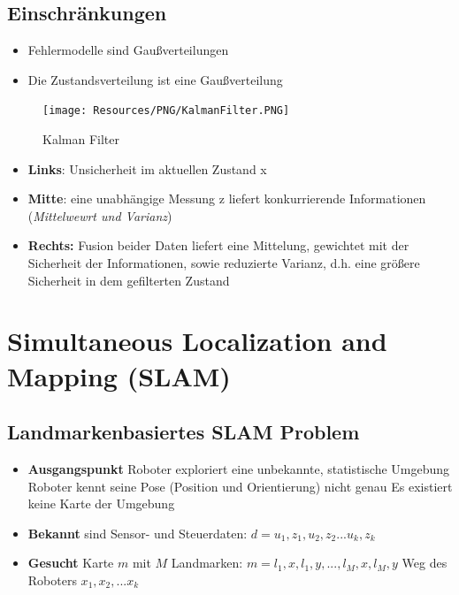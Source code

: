 \subsection{Einschränkungen}
\begin{itemize}
	\item Fehlermodelle sind Gaußverteilungen
	\item Die Zustandsverteilung ist eine Gaußverteilung
\end{itemize}
\begin{figure}[H]
	\begin{center}
		\texttt{[image: Resources/PNG/KalmanFilter.PNG]}
		\caption{Kalman Filter}
		\label{fig:PNG/KalmanFilter.PNG}
	\end{center}
\end{figure}
\begin{itemize}
	\item \textbf{Links}: Unsicherheit im aktuellen Zustand x
	\item \textbf{Mitte}: eine unabhängige Messung z liefert konkurrierende
		Informationen (\textit{Mittelwewrt und Varianz})
	\item \textbf{Rechts:} Fusion beider Daten liefert eine Mittelung, gewichtet
		mit der Sicherheit der Informationen, sowie reduzierte Varianz, d.h. eine
		größere Sicherheit in dem gefilterten Zustand
\end{itemize}

\section{Simultaneous Localization and Mapping (SLAM)}
\subsection{Landmarkenbasiertes SLAM Problem}
\begin{itemize}
	\item \textbf{Ausgangspunkt} Roboter exploriert eine unbekannte, statistische
		Umgebung
	\subitem Roboter kennt seine Pose (Position und Orientierung) nicht genau
	\subitem Es existiert keine Karte der Umgebung
	\item \textbf{Bekannt} sind Sensor- und Steuerdaten: $d = u_1, z_1, u_2, z_2
		... u_k, z_k$
	\item \textbf{Gesucht} Karte $m$ mit $M$ Landmarken: $m = l_1, x, l_1, y,
		..., l_M,x,l_M,y$
	\subitem Weg des Roboters $x_1, x_2, ... x_k$
\end{itemize}

